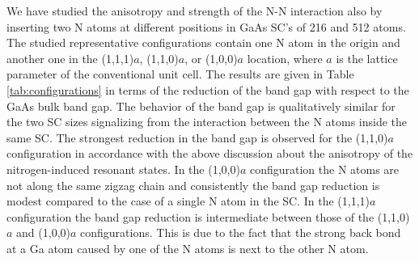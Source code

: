 \documentclass[aps,prb,10pt,twocolumn,groupedaddress]{revtex4-1}
\begin{document}
We have studied the anisotropy and strength of the N-N interaction
also by inserting two N atoms at different positions in GaAs
SC's of 216 and 512 atoms. The studied representative
configurations contain one N atom in the origin and another
one in the (1,1,1)$a$, (1,1,0)$a$, or (1,0,0)$a$ location, where $a$
is the lattice parameter of the conventional unit cell. The results are given
in Table \ref{tab:configurations} in terms of the reduction of the band gap with
respect to the GaAs bulk band gap. The behavior of the band gap is
qualitatively similar for the two SC sizes signalizing
from the interaction between the N atoms inside the same SC.
The strongest reduction in the band gap is observed for the (1,1,0)$a$
configuration in accordance with the above discussion about the
anisotropy of the nitrogen-induced resonant states.
In the (1,0,0)$a$ configuration the N atoms are not along the same
zigzag chain and consistently the band gap reduction is modest compared to the
case of a single N atom in the SC. In the (1,1,1)$a$ configuration the band gap
reduction is intermediate between those of the (1,1,0)$a$ and (1,0,0)$a$
configurations. This  is due to the fact that the strong back bond at a
Ga atom caused by one of  the N atoms is next to the other N atom.
\end{document}
